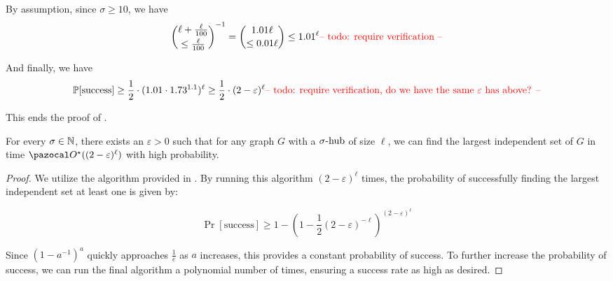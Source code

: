 By assumption, since $\sigma \geq 10$, we have
$$\binom{\ell + \frac{\ell}{100}}{\leq \frac{\ell}{100}}^{-1} = \binom{1.01\ell}{\leq 0.01\ell} \leq 1.01^\ell \text{{\color{red}-- todo: require verification --}}$$

And finally, we have
$$\mathbb{P}[\text{success}] \geq \frac{1}{2}\cdot(1.01 \cdot 1.73^{1.1})^\ell \geq \frac{1}{2} \cdot (2 - \varepsilon)^\ell \text{{\color{red}-- todo: require verification, do we have the same $\varepsilon$ has above? --}}$$

This ends the proof of .

\begin{theorem}
    For every $\sigma \in \mathbb{N}$, there exists an $\varepsilon > 0$ such that for any graph $G$ with a $\sigma\text{-hub}$ of size $\ell$, we can find the largest independent set of $G$ in time $\O^\star((2-\varepsilon)^\ell)$ with high probability.
\end{theorem}

\begin{proof}
    
    We utilize the algorithm provided in . By running this algorithm $(2-\varepsilon)^\ell$ times, the probability of successfully finding the largest independent set at least one is given by:

    $$\Pr[\text{success}] \geq 1 - (1 - \frac{1}{2}(2 - \varepsilon)^{-\ell})^{(2 - \varepsilon)^{\ell}}$$

    Since $(1 - a^{-1})^a$ quickly approaches $\frac{1}{e}$ as $a$ increases, this provides a constant probability of success. To further increase the probability of success, we can run the final algorithm a polynomial number of times, ensuring a success rate as high as desired.
\end{proof}